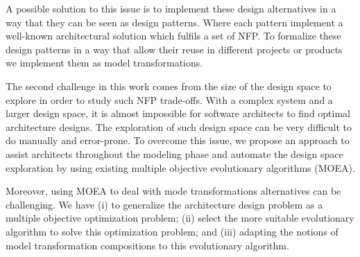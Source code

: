 \documentclass[conference]{IEEEtran}
\begin{document}
A possible solution to this issue is to implement these design alternatives in a way that they can be seen as design patterns. Where each pattern implement a well-known architectural solution which fulfils a set of NFP. To formalize these design patterns in a way that allow their reuse in different projects or products we implement them as model transformations.







The second challenge in this work comes from the size of the design space to explore in order to study such NFP trade-offs. With a complex system and a larger design space, it is almost impossible for software architects to find optimal architecture designs. The exploration of such design space can be very difficult to do manually and error-prone. To overcome this issue, we propose an approach to assist architects throughout the modeling phase and automate the design space exploration by using existing multiple objective evolutionary algorithms (MOEA).

Moreover, using MOEA to deal with mode transformations alternatives can be challenging. We have (i) to generalize the architecture design problem as a multiple objective optimization problem; (ii) select the more suitable evolutionary algorithm to solve this optimization problem; and (iii) adapting the notions of model transformation compositions to this evolutionary algorithm.
\end{document}
